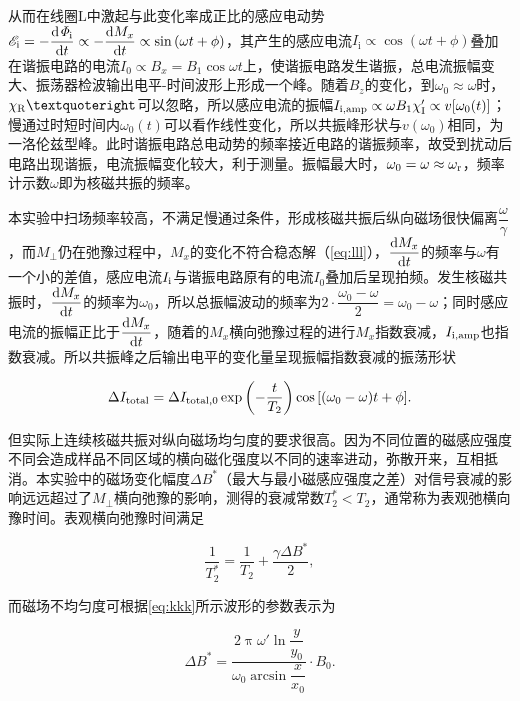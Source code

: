 从而在线圈\(\mathrm{L}\)中激起与此变化率成正比的感应电动势\(\mathscr{E}_{\mathrm{i}}=-\dfrac{\mathrm{d}\mathit{\Phi}_{\mathrm{i}}}{{\rm d}t}\propto-\dfrac{\mathrm{d}M_x}{{\rm d}t}\propto \sin{(\omega t+\phi)}\)，其产生的感应电流\(I_{\mathrm{i}}\propto \cos{(\omega t+\phi)}\)叠加在谐振电路的电流\(I_0\propto B_x=B_1\cos{\omega t}\)上，使谐振电路发生谐振，总电流振幅变大、振荡器检波输出电平-时间波形上形成一个峰。随着\(B_z\)的变化，到\(\omega_0\approx\omega\)时，\(\chi_{\rm R}’\)可以忽略，所以感应电流的振幅\(I_{\rm i,amp}\propto\omega B_1\chi'_{\rm I}\propto v[\omega_0(t)]\)；慢通过时短时间内\(\omega_0(t)\)可以看作线性变化，所以共振峰形状与\(v(\omega_0)\)相同，为一洛伦兹型峰。此时谐振电路总电动势的频率接近电路的谐振频率，故受到扰动后电路出现谐振，电流振幅变化较大，利于测量。振幅最大时，\(\omega_0=\omega\approx\omega_{\rm r}\)，频率计示数\(\omega\)即为核磁共振的频率。

本实验中扫场频率较高，不满足慢通过条件，形成核磁共振后纵向磁场很快偏离\(\dfrac{\omega}{\gamma}\)，而\(M_{\perp}\)仍在弛豫过程中，\(M_x\)的变化不符合稳态解（\cref{eq:lll}），\(\dfrac{{\rm d}M_x}{{\rm d}t}\)的频率与\(\omega\)有一个小的差值，感应电流\(I_{\rm i}\)与谐振电路原有的电流\(I_0\)叠加后呈现拍频。发生核磁共振时，\(\dfrac{{\rm d}M_x}{{\rm d}t}\)的频率为\(\omega_0\)，所以总振幅波动的频率为\(2\cdot\dfrac{\omega_0-\omega}{2}=\omega_0-\omega\)；同时感应电流的振幅正比于\(\dfrac{{\rm d}M_x}{{\rm d}t}\)，随着的\(M_x\)横向弛豫过程的进行\(M_x\)指数衰减，\(I_{\rm i,amp}\)也指数衰减。所以共振峰之后输出电平的变化量呈现振幅指数衰减的振荡形状

\begin{equation}
\Delta I_{\rm total}=\Delta I_{\rm total,0}\exp{\left(-\dfrac{t}{T_2}\right)}\cos{\left[(\omega_0-\omega)t+\phi\right]}.\label{eq:kkk}
\end{equation}

但实际上连续核磁共振对纵向磁场均匀度的要求很高。因为不同位置的磁感应强度不同会造成样品不同区域的横向磁化强度以不同的速率进动，弥散开来，互相抵消。本实验中的磁场变化幅度\(\Delta B^*\)（最大与最小磁感应强度之差）对信号衰减的影响远远超过了\(M_{\perp}\)横向弛豫的影响，测得的衰减常数\(T_2^*<T_2\)，通常称为表观弛横向豫时间。表观横向弛豫时间满足

\begin{equation}
\dfrac{1}{T_2^*}=\dfrac{1}{T_2}+\dfrac{\gamma \Delta B^*}{2},\label{eq:t2s}
\end{equation}

而磁场不均匀度可根据\cref{eq:kkk}所示波形的参数表示为

\begin{equation}
\Delta B^* = \dfrac{2\uppi\omega'\ln{\dfrac{y}{y_0}}}{\omega_0\arcsin{\dfrac{x}{x_0}}}\cdot B_0.\label{eq:deltab}
\end{equation}

